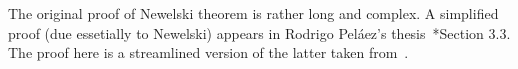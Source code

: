 \documentclass[creche.tex]{subfiles}
\begin{document}
The original proof of Newelski theorem is rather long and complex. A simplified proof (due essetially to Newelski) appears in Rodrigo Pel\'aez's thesis~\cite{Pelaez}*{Section 3.3}. The proof here is a streamlined version of the latter taken from~\cite{Z16}.

\begin{comment}


\section{Ziegler's example}

The language $L$ consists of a binary relation symbol $<$ and, for every positive integer $n$, a binary relation denoted by $|x-y|<n$. Consider the structure with domain $\QQ$ and the relation symbols interpreted in the natural way. Let $T$ be the theory of this structure.

\begin{proposition}
The theory $T$ has elimination of quantifiers.
\end{proposition}



$n\le d(x,z)\ \wedge\ m\le d(x,y)\ \imp\ n+m\le d(y,z)$

$x<y<z\ \wedge\ d(x,y)<n\ \wedge\ d(y,z)<m\ \imp\ d(x,z)<m+n$


$n\le d(x,y) \ \imp\ n+1\le d(x,y)$

$x<y\ \wedge\ n+1\le d(x,y) \ \imp\ \E z\ \big[x<z<y\ \wedge\ n\le d(x,z)\ \wedge\ 1\le d(z,y)\big]$







The language contains a ternary relation which we denote by $x<_zy$ and a unary function $f(x)$. 
\begin{itemize}
  \item[1.] $x<_zy$ is a dense liner order with least element $z$;
  \item[2.] $x<_zy<_zw\imp y<_xw$;
  \item[3.] $\displaystyle f^nz=z\wedge\bigwedge^{n-1}_{i=0}f^i(z)<_zf^{i+1}(z)$.
\end{itemize}

 
Write $r(x,y)$ for $x=y\vee y<_xf(x)\vee x<_yf(y)$


\section{Externally definable sets}
The set $\grD\cap A^{|{\gr z}|}$ is called the \emph{trace\/} of $\grD$ over $A$. For every formula $\psi({\gr z})\in L(\U)$ we define \emph{$\psi(A)$\/} $=$ $\psi({\gr\U})\cap A^{|{\gr z}|}$, that is, the trace on $A$ of the definable set $\psi({\gr\U})=\big\{{\gr a}\in\U^{|{\gr z}|}:\psi({\gr a})\big\}$. 


\end{comment}
\end{document}
